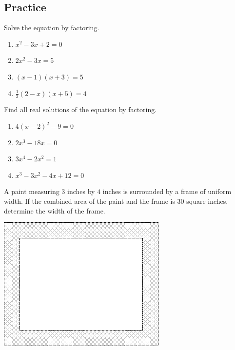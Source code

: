 \newpage

\subsection{Practice}

\begin{exercise}
Solve the equation by factoring.

\begin{enumerate}

\item
  \(x^2-3x+2=0\)
\item
  \(2x^2-3x=5\)
\item
  \((x-1)(x+3)=5\)
\item
  \(\frac13(2-x)(x+5)=4\)
\end{enumerate}
\end{exercise}

\begin{exercise}
Find all real solutions of the equation by factoring.

\begin{enumerate}

\item
  \(4(x-2)^2-9=0\)
\item
  \(2x^3-18x=0\)
\item
  \(3x^4-2x^2=1\)
\item
  \(x^3-3x^2-4x+12=0\)
\end{enumerate}
\end{exercise}

\begin{exercise}
A paint measuring \(3\) inches by \(4\) inches is surrounded by a frame
of uniform width. If the combined area of the paint and the frame is
\(30\) square inches, determine the width of the frame.

\includegraphics{figs/tikz-paint-uniform-width.png}\\
\end{exercise}
\vspace*{5\baselineskip}


